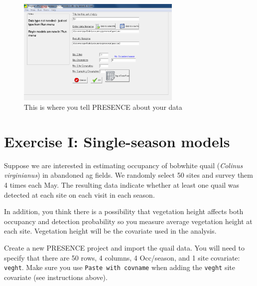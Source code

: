 \documentclass[12pt]{article}\usepackage[]{graphicx}\usepackage[]{color}
\begin{document}
\begin{figure}[h!]
  \centering
  \includegraphics[width=0.7\textwidth]{figs/pres-setup}
  \caption{\small This is where you tell PRESENCE about your data}
  \label{fig:pres-setup}
\end{figure}

\clearpage

\section*{Exercise I: Single-season models}

Suppose we are interested in estimating occupancy of bobwhite quail
({\it Colinus virginianus}) in abandoned ag fields. We randomly select
50 sites and survey them 4 times each May. The resulting data indicate
whether at least one quail was detected at each site on each visit in
each season.    

In addition, you think there is a possibility that vegetation height
affects both occupancy and detection probability so you measure
average vegetation height at each site. Vegetation height will be the
covariate used in the analysis. 

Create a new PRESENCE project and import the quail data. You will
need to specify that there are 50 rows, 4 columns, 4 Occ/season, and 1
site covariate: \texttt{veght}. Make sure you use \texttt{Paste with
  covname} when adding the \texttt{veght} site covariate (see
instructions above).  
\end{document}
